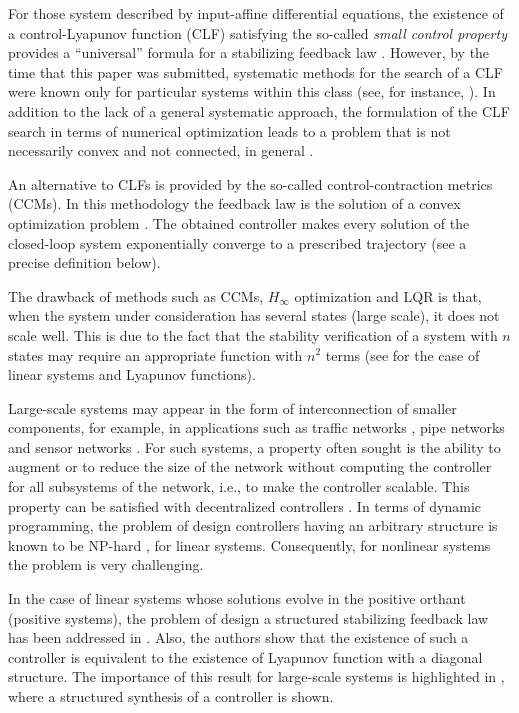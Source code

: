 \documentclass[10pt,twocolumn,twoside]{IEEEtran}
\theoremstyle{plain}
\theoremstyle{definition}
\theoremstyle{remark}
\begin{document}
For those system described by input-affine differential equations,  the existence of a control-Lyapunov function (CLF) satisfying the so-called \emph{small control property} provides a ``universal'' formula for a stabilizing feedback law  \cite{Sontag1983,Sontag1989a}. However, by the time that this paper was submitted, systematic methods for the search of a CLF were known only for particular systems within this class (see, for instance, \cite{MazencMalisoff2006}). In addition to the lack of a general systematic approach, the formulation of the CLF search in terms of numerical optimization leads to a problem that is not necessarily convex and not connected, in general \cite{Rantzer:2001}.

An alternative to CLFs is provided by the so-called control-contraction metrics (CCMs). In this methodology the feedback law is the solution of a convex optimization problem \cite{Manchester2014a}. The obtained controller makes every solution of the closed-loop system exponentially converge to a prescribed trajectory (see a precise definition below).

The drawback of methods such as CCMs, $H_\infty$ optimization and LQR is that, when the system under consideration has several states (large scale), it does not scale well. This is due to the fact that the stability verification of a system with $n$ states may require an appropriate function with $n^2$ terms (see \cite{Rantzer2015} for the case of linear systems and Lyapunov functions).

Large-scale systems may appear in the form of interconnection of smaller components, for example, in applications such as traffic networks \cite{CanudasdeWitMorbidiLeonOjedaEtAl2015}, pipe networks \cite{Persis2011a} and sensor networks \cite{Pajic2011}. For such systems, a property often sought is the ability to augment or to reduce the size of the network without computing the controller for all subsystems of the network, i.e., to make the controller scalable. This property can be satisfied with decentralized controllers \cite{Siljak1991}. In terms of dynamic programming, the problem of design controllers having an arbitrary structure is known to be NP-hard \cite{BlondelTsitsiklis1997,Tanaka2011}, for linear systems. Consequently, for nonlinear systems the problem is very challenging.

In the case of linear systems whose solutions evolve in the positive orthant (positive systems), the problem of design a structured stabilizing feedback law has been addressed in \cite{Tanaka2011}. Also, the authors show that the existence of such a controller is equivalent to the existence of Lyapunov function with a diagonal structure. The importance of this result for large-scale systems is highlighted in \cite{Rantzer2015}, where a structured synthesis of a controller is shown.
\end{document}
